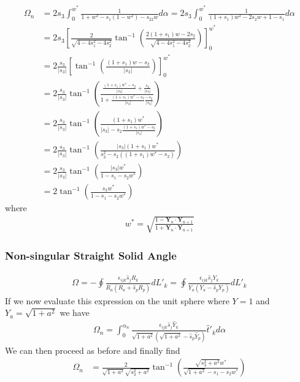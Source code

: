 \begin{align}
\Omega_n
&=2s_3\int_0^{w^*}\frac{1}{1+w^2-s_1(1-w^2)-s_22w}d\alpha
=2s_3\int_0^{w^*}\frac{1}{(1+s_1)w^2-2s_2w+1-s_1}d\alpha\nonumber\\
&=2s_3\left[\frac{2}{\sqrt{4-4s_1^2-4s_2^2}}\tan^{-1}\left(\frac{2(1+s_1)w-2s_2}{\sqrt{4-4s_1^2-4s_2^2}}\right)\right]_0^{w^*}\nonumber\\
&=2\frac{s_3}{|s_3|}\left[\tan^{-1}\left(\frac{(1+s_1)w-s_2}{|s_3|}\right)\right]_0^{w^*}\nonumber\\
&=2\frac{s_3}{|s_3|}\tan^{-1}\left(\frac{\frac{(1+s_1)w^*-s_2}{|s_3|}+\frac{s_2}{|s_3|}}{1+\frac{(1+s_1)w^*-s_2}{|s_3|}\frac{-s_2}{|s_3|}}\right)\nonumber\\
&=2\frac{s_3}{|s_3|}\tan^{-1}\left(\frac{(1+s_1)w^*}{|s_3|-s_2\frac{(1+s_1)w^*-s_2}{|s_3|}}\right)\nonumber\\
&=2\frac{s_3}{|s_3|}\tan^{-1}\left(\frac{|s_3|(1+s_1)w^*}{s_3^2-s_2((1+s_1)w^*-s_2)}\right)\nonumber\\
&=2\frac{s_3}{|s_3|}\tan^{-1}\left(\frac{|s_3|w^*}{1-s_1-s_2w^*}\right)\nonumber\\
&=2\tan^{-1}\left(\frac{s_3w^*}{1-s_1-s_2w^*}\right)
\end{align}
where
\begin{align}
w^*=\sqrt{\frac{1-\bm Y_n\cdot \bm Y_{n+1}}{1+\bm Y_n\cdot \bm Y_{n+1}}}
\end{align}

\subsubsection{Non-singular Straight Solid Angle}
\begin{align}
\Omega=-\oint\frac{\epsilon_{ijk}\hat{s}_jR_k}{R_a(R_a+\hat{s}_pR_p)}dL'_k=\oint\frac{\epsilon_{ijk}\hat{s}_jY_k}{Y_a(Y_a-\hat{s}_pY_p)}dL'_k
\end{align}
If we now evaluate this expression on the unit sphere where $Y=1$ and $Y_a=\sqrt{1+a^2}$ we have
\begin{align}
\Omega_n=\int_0^{\alpha_n}\frac{\epsilon_{ijk}\hat{s}_j\hat{Y}_k}{\sqrt{1+a^2}(\sqrt{1+a^2}-\hat{s}_p\hat{Y}_p)}\hat{t}'_kd\alpha
\end{align}
We can then proceed as before and finally find
\begin{align}
\Omega_n
&=\frac{2}{\sqrt{1+a^2}\sqrt{s_3^2+a^2}}\tan^{-1}\left(\frac{\sqrt{s_3^2+a^2}w^*}{\sqrt{1+a^2}-s_1-s_2w^*}\right)
\end{align}


